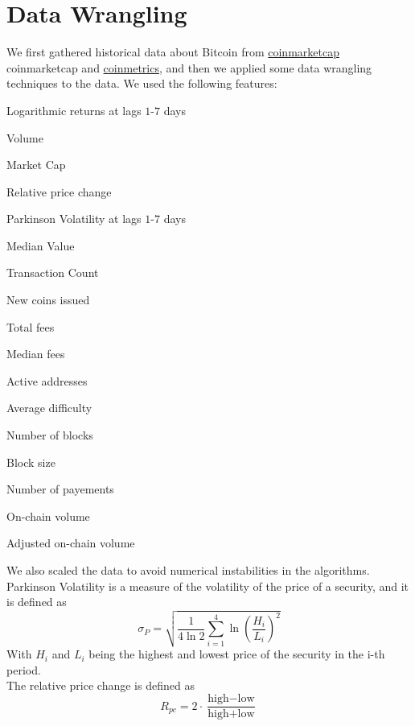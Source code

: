 \documentclass[12pt]{article}
\begin{document}
\section{Data Wrangling}
We first gathered historical data about Bitcoin from \href{https://coinmarketcap.com}{coinmarketcap} coinmarketcap and \href{https://coinmetrics.io}{coinmetrics}, and then we applied some data wrangling techniques to the data. We used the following features: 
\begin{list}{-}{ }
    \item Logarithmic returns at lags $1$-$7$ days
    \item Volume
    \item Market Cap
    \item Relative price change
    \item Parkinson Volatility at lags $1$-$7$ days
    \item Median Value
    \item Transaction Count
    \item New coins issued
    \item Total fees
    \item Median fees
    \item Active addresses
    \item Average difficulty
    \item Number of blocks
    \item Block size
    \item Number of payements
    \item On-chain volume
    \item Adjusted on-chain volume
\end{list}
We also scaled the data to avoid numerical instabilities in the algorithms.
\\Parkinson Volatility is a measure of the volatility of the price of a security, and it is defined as
\begin{equation}
    \sigma_P = \sqrt{\frac{1}{4\ln 2} \sum_{i=1}^4 \ln \left( \frac{H_i}{L_i} \right)^2}
\end{equation}
With $H_i$ and $L_i$ being the highest and lowest price of the security in the i-th period.
\\The relative price change is defined as
\begin{equation}
    R_{pc} = 2 \cdot \frac{\text{high} - \text{low}}{\text{high} + \text{low}}
\end{equation}
\end{document}
